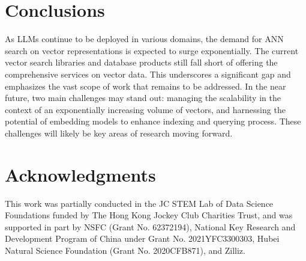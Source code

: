 \documentclass[11pt]{article}
\begin{document}



\section{Conclusions}
\label{bolong_sec:conclusions}

As LLMs continue to be deployed in various domains, the demand for ANN search on vector representations is expected to surge exponentially. The current vector search libraries and database products still fall short of offering the comprehensive services on vector data. This underscores a significant gap and emphasizes the vast scope of work that remains to be addressed. In the near future, two main challenges may stand out: managing the scalability in the context of an exponentially increasing volume of vectors, and harnessing the potential of embedding models to enhance indexing and querying process. These challenges will likely be key areas of research moving forward. 


\section{Acknowledgments}
\label{bolong_sec:acknowledgements}

This work was partially conducted in the JC STEM Lab of Data Science Foundations funded by The Hong Kong Jockey Club Charities Trust, and was supported in part by NSFC (Grant No. 62372194), National Key Research and
Development Program of China under Grant No. 2021YFC3300303, Hubei Natural Science Foundation (Grant No. 2020CFB871), and Zilliz.
\end{document}
